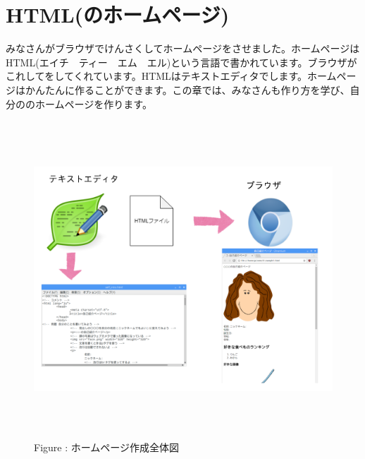 \documentclass[a4paper,12pt]{jarticle}
\begin{document}
\section{HTML(のホームページ)}
みなさんがブラウザでけんさくしてホームページをさせました。ホームページはHTML(エイチ　ティー　エム　エル)という言語で書かれています。ブラウザがこれしてをしてくれています。HTMLはテキストエディタでします。ホームページはかんたんに作ることができます。この章では、みなさんも作り方を学び、自分ののホームページを作ります。


\bigskip


\bigskip


\bigskip


\bigskip



\begin{figure}[hb]
  \centering
  \begin{minipage}{15.801cm}
    {\upshape
      \includegraphics[width=15.801cm,height=11.85cm]{textbook-img140.png}
      \newline
      Figure : ホームページ作成全体図}
  \end{minipage}
\end{figure}
\clearpage
\end{document}
